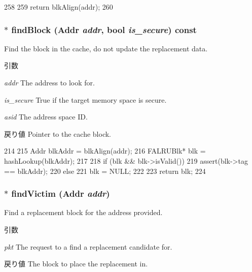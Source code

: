 \begin{DoxyCode}
258     {
259         return blkAlign(addr);
260     }
\end{DoxyCode}
\hypertarget{classFALRU_ac33a8d39699e8ad6ba542fe00377e99f}{
\subsubsection[{findBlock}]{ $\ast$ findBlock ({\bf Addr} {\em addr}, \/  bool {\em is\_\-secure}) const}}
\label{classFALRU_ac33a8d39699e8ad6ba542fe00377e99f}
Find the block in the cache, do not update the replacement data. 
\begin{DoxyParams}{引数}
\item[{\em addr}]The address to look for. \item[{\em is\_\-secure}]True if the target memory space is secure. \item[{\em asid}]The address space ID. \end{DoxyParams}
\begin{DoxyReturn}{戻り値}
Pointer to the cache block. 
\end{DoxyReturn}



\begin{DoxyCode}
214 {
215     Addr blkAddr = blkAlign(addr);
216     FALRUBlk* blk = hashLookup(blkAddr);
217 
218     if (blk && blk->isValid()) {
219         assert(blk->tag == blkAddr);
220     } else {
221         blk = NULL;
222     }
223     return blk;
224 }
\end{DoxyCode}
\hypertarget{classFALRU_aa576cf2f9fcd41bff96e7a930ae24849}{
\subsubsection[{findVictim}]{ $\ast$ findVictim ({\bf Addr} {\em addr})}}
\label{classFALRU_aa576cf2f9fcd41bff96e7a930ae24849}
Find a replacement block for the address provided. 
\begin{DoxyParams}{引数}
\item[{\em pkt}]The request to a find a replacement candidate for. \end{DoxyParams}
\begin{DoxyReturn}{戻り値}
The block to place the replacement in. 
\end{DoxyReturn}



